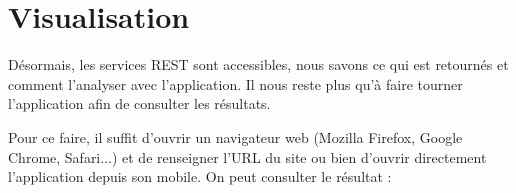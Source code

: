 
\section{Visualisation}


Désormais, les services REST sont accessibles, nous savons ce qui est retournés et comment l'analyser avec l'application. Il nous reste plus qu'à faire tourner l'application afin de consulter les résultats.

Pour ce faire, il suffit d'ouvrir un navigateur web (Mozilla Firefox, Google Chrome, Safari...) et de renseigner l'URL du site ou bien d'ouvrir directement l'application depuis son mobile. On peut consulter le résultat :




